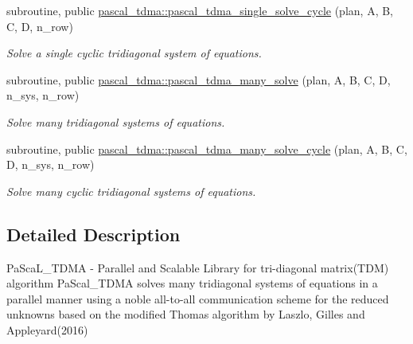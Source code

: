 \begin{DoxyCompactItemize}
subroutine, public \mbox{\hyperlink{namespacepascal__tdma_ac8e377fa86c75126380f0196f6046043}{pascal\+\_\+tdma\+::pascal\+\_\+tdma\+\_\+single\+\_\+solve\+\_\+cycle}} (plan, A, B, C, D, n\+\_\+row)
\begin{DoxyCompactList}\small\item\em Solve a single cyclic tridiagonal system of equations. \end{DoxyCompactList}\item 
subroutine, public \mbox{\hyperlink{namespacepascal__tdma_afa0c78b8377f5fe1059907befda3c940}{pascal\+\_\+tdma\+::pascal\+\_\+tdma\+\_\+many\+\_\+solve}} (plan, A, B, C, D, n\+\_\+sys, n\+\_\+row)
\begin{DoxyCompactList}\small\item\em Solve many tridiagonal systems of equations. \end{DoxyCompactList}\item 
subroutine, public \mbox{\hyperlink{namespacepascal__tdma_acbaed65e67ecbfd92a8f1d51d1b69fd5}{pascal\+\_\+tdma\+::pascal\+\_\+tdma\+\_\+many\+\_\+solve\+\_\+cycle}} (plan, A, B, C, D, n\+\_\+sys, n\+\_\+row)
\begin{DoxyCompactList}\small\item\em Solve many cyclic tridiagonal systems of equations. \end{DoxyCompactList}\end{DoxyCompactItemize}


\subsection{Detailed Description}
Pa\+Sca\+L\+\_\+\+T\+D\+MA -\/ Parallel and Scalable Library for tri-\/diagonal matrix(\+T\+D\+M) algorithm Pa\+Scal\+\_\+\+T\+D\+MA solves many tridiagonal systems of equations in a parallel manner using a noble all-\/to-\/all communication scheme for the reduced unknowns based on the modified Thomas algorithm by Laszlo, Gilles and Appleyard(2016) 

